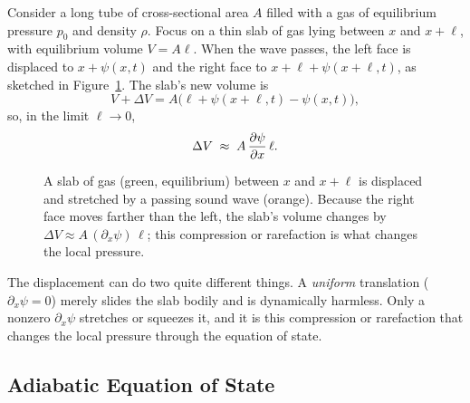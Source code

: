 Consider a long tube of cross-sectional area $A$ filled with a gas of equilibrium pressure $p_0$ and density $\rho$. Focus on a thin slab of gas lying between $x$ and $x + \ell$, with equilibrium volume $V = A\ell$. When the wave passes, the left face is displaced to $x + \psi(x,t)$ and the right face to $x + \ell + \psi(x + \ell, t)$, as sketched in Figure~\ref{fig:sound-slab}. The slab's new volume is
\begin{equation}
    V + \Delta V = A\bigl(\ell + \psi(x+\ell, t) - \psi(x,t)\bigr),
\end{equation}
so, in the limit $\ell \to 0$,
\begin{equation}
    \Delta V \;\approx\; A\,\pdv{\psi}{x}\,\ell.
\end{equation}

\begin{figure}[H]
\centering
{}
\caption{A slab of gas (green, equilibrium) between $x$ and $x+\ell$ is displaced and stretched by a passing sound wave (orange). Because the right face moves farther than the left, the slab's volume changes by $\Delta V \approx A\,(\partial_x\psi)\,\ell$; this compression or rarefaction is what changes the local pressure.}
\label{fig:sound-slab}
\end{figure}

The displacement can do two quite different things. A \emph{uniform} translation ($\partial_x\psi = 0$) merely slides the slab bodily and is dynamically harmless. Only a nonzero $\partial_x\psi$ stretches or squeezes it, and it is this compression or rarefaction that changes the local pressure through the equation of state.

\subsection{Adiabatic Equation of State}

